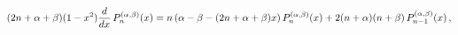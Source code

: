 \[(2n+\alpha+\beta)(1-x^{2})\frac{d}{dx}\mathop{P^{(\alpha,\beta)}_{n}\/}%
\nolimits\!\left(x\right)=n\left(\alpha-\beta-(2n+\alpha+\beta)x\right)\mathop%
{P^{(\alpha,\beta)}_{n}\/}\nolimits\!\left(x\right)+2(n+\alpha)(n+\beta)%
\mathop{P^{(\alpha,\beta)}_{n-1}\/}\nolimits\!\left(x\right),\]